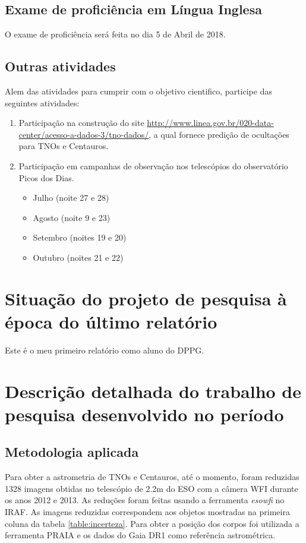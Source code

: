 \documentclass[a4paper, 11pt]{article}
\begin{document}
\subsection{Exame de profici\^encia em L\'ingua Inglesa}

O exame de proficiência será feita no dia 5 de Abril de 2018.

\subsection{Outras atividades}

Alem das atividades para cumprir com o objetivo cientifico, participe das seguintes atividades:

\begin{enumerate}
  \item Participação na construção do site \url{http://www.linea.gov.br/020-data-center/acesso-a-dados-3/tno-dados/}, a qual fornece predição de ocultações para TNOs e Centauros. 
  \item Participação em campanhas de observação nos telescópios do observatório Picos dos Dias. 
  \begin{itemize}
    \item Julho (noite 27 e 28)
    \item Agosto (noite 9 e 23) %
    \item Setembro (noites 19 e 20)
    \item Outubro (noites 21 e 22)
  \end{itemize}
\end{enumerate}
\section{Situação do projeto de pesquisa à época do último relatório}
Este é o meu primeiro relatório como aluno do DPPG.
\section{Descrição detalhada do trabalho de pesquisa desenvolvido no período}

\subsection{Metodologia aplicada}
Para obter a astrometria de TNOs e Centauros, at\'e o momento, foram reduzidas 1328 imagens obtidas no telesc\'opio de 2.2m do ESO com a c\^amera WFI durante os anos 2012 e 2013. As reduções foram feitas usando a ferramenta \textit{esowfi} no IRAF. As imagens reduzidas correspondem aos objetos mostradas na primeira coluna da tabela \ref{table:incerteza}. Para obter a posição dos corpos foi utilizada a ferramenta PRAIA e os dados do Gaia DR1 como refer\^encia astrom\'etrica. 
\end{document}
